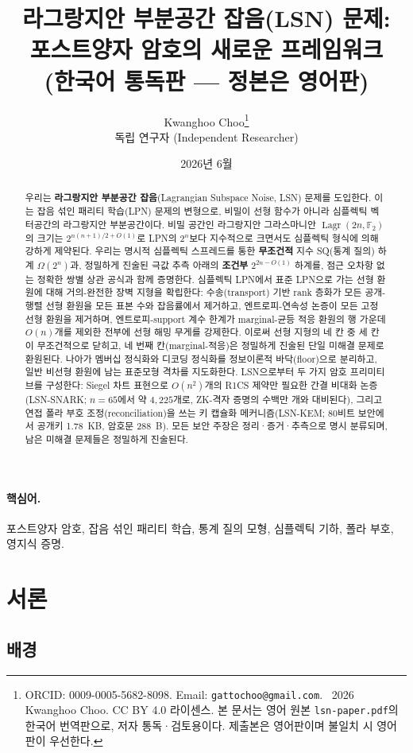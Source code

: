 \documentclass[11pt,a4paper]{article}
\title{라그랑지안 부분공간 잡음(LSN) 문제: \\ 포스트양자 암호의 새로운 프레임워크 \\[4pt] {\large (한국어 통독판 --- 정본은 영어판)}}
\author{Kwanghoo Choo\thanks{ORCID: 0009-0005-5682-8098. Email: \texttt{gattochoo@gmail.com}. \textcopyright~2026 Kwanghoo Choo. CC BY 4.0 라이센스. 본 문서는 영어 원본 \texttt{lsn-paper.pdf}의 한국어 번역판으로, 저자 통독·검토용이다. 제출본은 영어판이며 불일치 시 영어판이 우선한다.}\\ \normalsize 독립 연구자 (Independent Researcher)}
\date{2026년 6월}
\theoremstyle{plain}
\theoremstyle{definition}
\newcommand{\F}{\mathbb{F}}
\DeclareMathOperator{\Lagr}{Lagr}
\begin{document}
\maketitle

\begin{abstract}
우리는 \textbf{라그랑지안 부분공간 잡음}(Lagrangian Subspace Noise, LSN) 문제를 도입한다. 이는 잡음 섞인 패리티 학습(LPN) 문제의 변형으로, 비밀이 선형 함수가 아니라 심플렉틱 벡터공간의 라그랑지안 부분공간이다. 비밀 공간인 라그랑지안 그라스마니안 $\Lagr(2n,\F_2)$의 크기는 $2^{n(n+1)/2+O(1)}$로 LPN의 $2^n$보다 지수적으로 크면서도 심플렉틱 형식에 의해 강하게 제약된다. 우리는 명시적 심플렉틱 스프레드를 통한 \textbf{무조건적} 지수 SQ(통계 질의) 하계 $\Omega(2^n)$과, 정밀하게 진술된 극값 추측 아래의 \textbf{조건부} $2^{2n-O(1)}$ 하계를, 점근 오차항 없는 정확한 쌍별 상관 공식과 함께 증명한다. 심플렉틱 LPN에서 표준 LPN으로 가는 선형 환원에 대해 거의-완전한 장벽 지형을 확립한다: 수송(transport) 기반 rank 층화가 모든 공개-행렬 선형 환원을 모든 표본 수와 잡음률에서 제거하고, 엔트로피-연속성 논증이 모든 고정 선형 환원을 제거하며, 엔트로피-support 계수 한계가 marginal-균등 적응 환원의 행 가운데 $O(n)$개를 제외한 전부에 선형 해밍 무게를 강제한다. 이로써 선형 지형의 네 칸 중 세 칸이 무조건적으로 닫히고, 네 번째 칸(marginal-적응)은 정밀하게 진술된 단일 미해결 문제로 환원된다. 나아가 멤버십 정식화와 디코딩 정식화를 정보이론적 바닥(floor)으로 분리하고, 일반 비선형 환원에 남는 표준모형 격차를 지도화한다. LSN으로부터 두 가지 암호 프리미티브를 구성한다: Siegel 차트 표현으로 $O(n^2)$개의 R1CS 제약만 필요한 간결 비대화 논증(LSN-SNARK; $n=65$에서 약 $4{,}225$개로, ZK-격자 증명의 수백만 개와 대비된다), 그리고 연접 폴라 부호 조정(reconciliation)을 쓰는 키 캡슐화 메커니즘(LSN-KEM; 80비트 보안에서 공개키 1.78~KB, 암호문 288~B). 모든 보안 주장은 정리·증거·추측으로 명시 분류되며, 남은 미해결 문제들은 정밀하게 진술된다.
\end{abstract}

\paragraph{\textbf{핵심어.}} 포스트양자 암호, 잡음 섞인 패리티 학습, 통계 질의 모형, 심플렉틱 기하, 폴라 부호, 영지식 증명.


\section{서론}

\subsection{배경}
\end{document}
